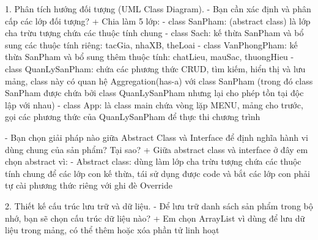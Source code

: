 
1. Phân tích hướng đối tượng (UML Class Diagram).
-   Bạn cần xác định và phân cấp các lớp đối tượng?
    + Chia làm 5 lớp:
        - class SanPham: (abstract class) là lớp cha trừu tượng chứa các thuộc tính chung
        - class Sach: kế thừa SanPham và bổ sung các thuộc tính riêng: tacGia, nhaXB, theLoai
        - class VanPhongPham: kế thừa SanPham và bổ sung thêm thuộc tính: chatLieu, mauSac, thuongHieu
        - class QuanLySanPham: chứa các phương thức CRUD, tìm kiếm, hiển thị và lưu mảng, class này có quan hệ Aggregation(has-a) với class SanPham
            (trong đó class SanPham được chứa bởi class QuanLySanPham nhưng lại cho phép tồn tại độc lập với nhau)
        - class App: là class main chứa vòng lặp MENU, mảng cho trước, gọi các phương thức của QuanLySanPham để thực thi chương trình

-   Bạn chọn giải pháp nào giữa Abstract Class và Interface để định nghĩa hành vi dùng chung của sản phẩm? Tại sao?
    + Giữa abstract class và interface ở đây em chọn abstract vì:
        - Abstract class: dùng làm lớp cha trừu tượng chứa các thuộc tính chung để các lớp con kế thừa, tái sử dụng được code và bắt các lớp con phải tự cài phương thức riêng với ghi đè Override

2. Thiết kế cấu trúc lưu trữ và dữ liệu.
-   Để lưu trữ danh sách sản phẩm trong bộ nhớ, bạn sẽ chọn cấu trúc dữ liệu nào?
    + Em chọn ArrayList vì dùng để lưu dữ liệu trong mảng, có thể thêm hoặc xóa phần tử linh hoạt
